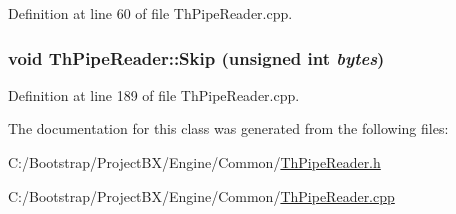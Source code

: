 Definition at line 60 of file ThPipeReader.cpp.\hypertarget{class_th_pipe_reader_3ddf88fbd931b32aa11e8d80274686ea}{
\subsubsection[{Skip}]{\setlength{\rightskip}{0pt plus 5cm}void ThPipeReader::Skip (unsigned int {\em bytes})}}
\label{class_th_pipe_reader_3ddf88fbd931b32aa11e8d80274686ea}




Definition at line 189 of file ThPipeReader.cpp.

The documentation for this class was generated from the following files:\begin{CompactItemize}
\item 
C:/Bootstrap/ProjectBX/Engine/Common/\hyperlink{_th_pipe_reader_8h}{ThPipeReader.h}\item 
C:/Bootstrap/ProjectBX/Engine/Common/\hyperlink{_th_pipe_reader_8cpp}{ThPipeReader.cpp}\end{CompactItemize}
